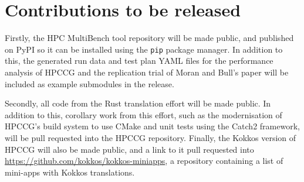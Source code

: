 \section{Contributions to be released}
\label{ssec:open-source-to-be-released}

Firstly, the HPC MultiBench tool repository will be made public, and published on PyPI so it can be installed using the \texttt{pip} package manager. In addition to this, the generated run data and test plan YAML files for the performance analysis of HPCCG and the replication trial of Moran and Bull's paper \cite{moranEmergingTechnologiesRust2023} will be included as example submodules in the release.

Secondly, all code from the Rust translation effort will be made public. In addition to this, corollary work from this effort, such as the modernisation of HPCCG's build system to use CMake and unit tests using the Catch2 framework, will be pull requested into the HPCCG repository. Finally, the Kokkos version of HPCCG will also be made public, and a link to it pull requested into \url{https://github.com/kokkos/kokkos-miniapps}, a repository containing a list of mini-apps with Kokkos translations.



